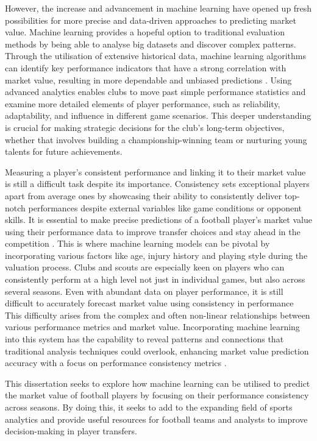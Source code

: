 \documentclass[12pt, a4paper,oneside]{book}
\numberwithin{equation}{section}
\begin{document}
However, the increase and advancement in machine learning have opened up fresh possibilities for more precise and data-driven approaches to predicting market value. Machine learning provides a hopeful option to traditional evaluation methods by being able to analyse big datasets and discover complex patterns. Through the utilisation of extensive historical data, machine learning algorithms can identify key performance indicators that have a strong correlation with market value, resulting in more dependable and unbiased predictions \cite{martinezb2020}. Using advanced analytics enables clubs to move past simple performance statistics and examine more detailed elements of player performance, such as reliability, adaptability, and influence in different game scenarios. This deeper understanding is crucial for making strategic decisions for the club's long-term objectives, whether that involves building a championship-winning team or nurturing young talents for future achievements.

Measuring a player's consistent performance and linking it to their market value is still a difficult task despite its importance. Consistency sets exceptional players apart from average ones by showcasing their ability to consistently deliver top-notch performances despite external variables like game conditions or opponent skills. It is essential to make precise predictions of a football player's market value using their performance data to improve transfer choices and stay ahead in the competition \cite{harris2019}. This is where machine learning models can be pivotal by incorporating various factors like age, injury history and playing style during the valuation process. Clubs and scouts are especially keen on players who can consistently perform at a high level not just in individual games, but also across several seasons. Even with abundant data on player performance, it is still difficult to accurately forecast market value using consistency in performance This difficulty arises from the complex and often non-linear relationships between various performance metrics and market value. Incorporating machine learning into this system has the capability to reveal patterns and connections that traditional analysis techniques could overlook, enhancing market value prediction accuracy with a focus on performance consistency metrics \cite{jones2020}. 

This dissertation seeks to explore how machine learning can be utilised to predict the market value of football players by focusing on their performance consistency across seasons. By doing this, it seeks to add to the expanding field of sports analytics and provide useful resources for football teams and analysts to improve decision-making in player transfers.
\end{document}
